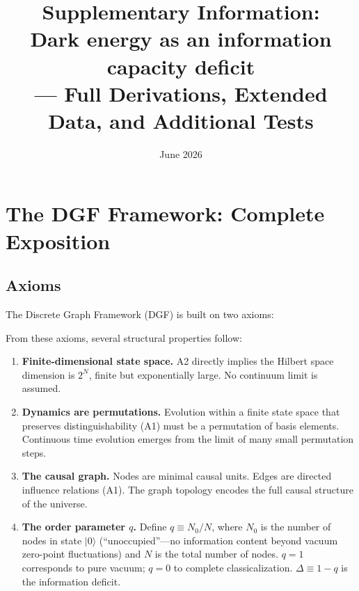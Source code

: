 \documentclass[12pt,a4paper]{article}
\title{\bf Supplementary Information:\\
Dark energy as an information capacity deficit\\
--- Full Derivations, Extended Data, and Additional Tests}
\date{June 2026}
\begin{document}
\maketitle
\tableofcontents

\section{The DGF Framework: Complete Exposition}

\subsection{Axioms}

The Discrete Graph Framework (DGF) is built on two axioms:

\vspace{4pt}
\noindent{}

\vspace{4pt}
From these axioms, several structural properties follow:

\begin{enumerate}
\item {\bf Finite-dimensional state space.} A2 directly implies the Hilbert space dimension is $2^N$, finite but exponentially large. No continuum limit is assumed.
\item {\bf Dynamics are permutations.} Evolution within a finite state space that preserves distinguishability (A1) must be a permutation of basis elements. Continuous time evolution emerges from the limit of many small permutation steps.
\item {\bf The causal graph.} Nodes are minimal causal units. Edges are directed influence relations (A1). The graph topology encodes the full causal structure of the universe.
\item {\bf The order parameter $q$.} Define $q\equiv N_0/N$, where $N_0$ is the number of nodes in state $|0\rangle$ (``unoccupied''---no information content beyond vacuum zero-point fluctuations) and $N$ is the total number of nodes. $q=1$ corresponds to pure vacuum; $q=0$ to complete classicalization. $\Delta\equiv1-q$ is the information deficit.
\end{enumerate}
\end{document}
